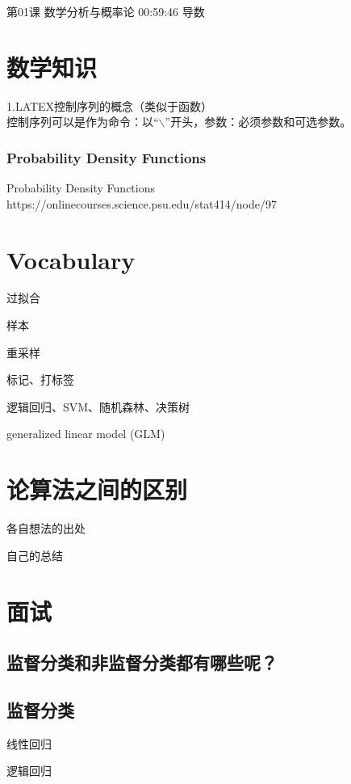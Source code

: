 \documentclass[UTF8]{ctexart}
\begin{document}
第01课 数学分析与概率论 00:59:46 导数









\section{数学知识}
    1.LATEX控制序列的概念（类似于函数） \\ 控制序列可以是作为命令：以“$\backslash$”开头，参数：必须参数和可选参数。
\subsubsection{Probability Density Functions}

Probability Density Functions https://onlinecourses.science.psu.edu/stat414/node/97

\section{Vocabulary}

过拟合

样本 

重采样

标记、打标签

逻辑回归、SVM、随机森林、决策树

generalized linear model (GLM)

\section{论算法之间的区别}

各自想法的出处

自己的总结

\section{面试}

\subsection{监督分类和非监督分类都有哪些呢？}

\subsection{监督分类}

线性回归

逻辑回归
\end{document}
